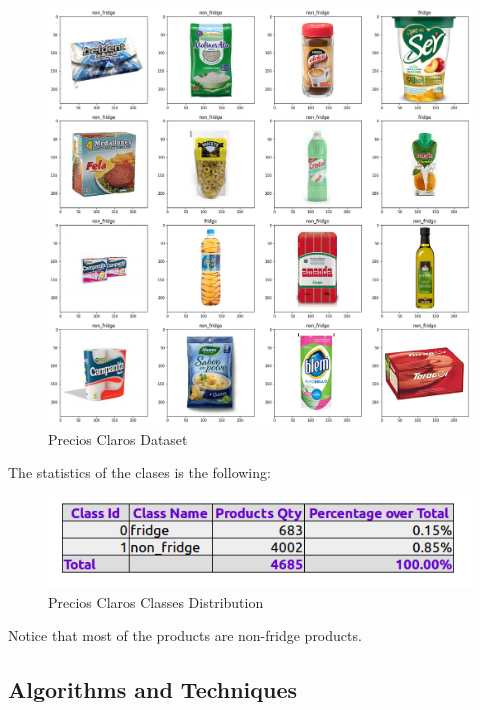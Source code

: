 \documentclass[a4paper,10pt]{article}
\begin{document}
\begin{figure}[h]
  \includegraphics[width=\linewidth]{products2.png}
  \caption{Precios Claros Dataset}
  \label{fig:boat1}
\end{figure}

The statistics of the clases is the following:

\begin{figure}[h]
  \includegraphics[width=\linewidth]{classes_distribution.png}
  \caption{Precios Claros Classes Distribution}
  \label{fig:boat1}
\end{figure}

Notice that most of the products are non-fridge products.


\subsection{Algorithms and Techniques}
\end{document}
